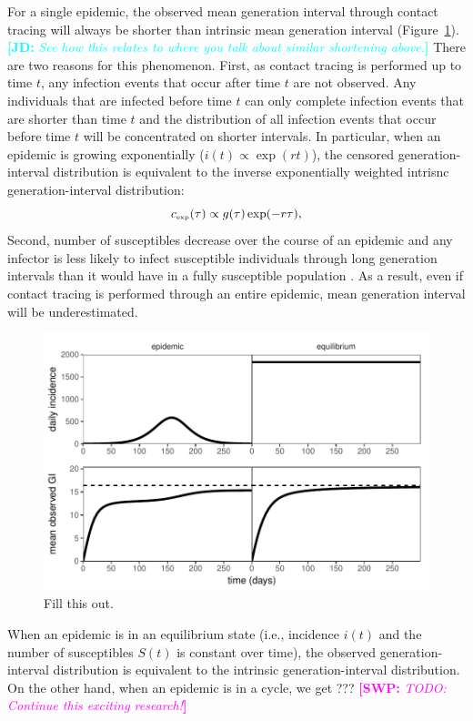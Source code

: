 \documentclass{article}
\newcommand{\tsub}[2]{#1_{{\textrm{\tiny #2}}}}
\newcommand{\comment}[3]{\textcolor{#1}{\textbf{[#2: }\textsl{#3}\textbf{]}}}
\newcommand{\jd}[1]{\comment{cyan}{JD}{#1}}
\newcommand{\swp}[1]{\comment{magenta}{SWP}{#1}}
\begin{document}
For a single epidemic, the observed mean generation interval through contact tracing will always be shorter than intrinsic mean generation interval (Figure~\ref{fig:censor}).
\jd{See how this relates to where you talk about similar shortening above.}
There are two reasons for this phenomenon.
First, as contact tracing is performed up to time $t$, any infection events that occur after time $t$ are not observed.
Any individuals that are infected before time $t$ can only complete infection events that are shorter than time $t$ and the distribution of all infection events that occur before time $t$ will be concentrated on shorter intervals.
In particular, when an epidemic is growing exponentially ($i(t) \propto \exp(rt)$), the censored generation-interval distribution is equivalent to the inverse exponentially weighted intrisnc generation-interval distribution:
\begin{equation}
\tsub{c}{exp}(\tau) \propto g(\tau) \exp(-r\tau),
\end{equation}
Second, number of susceptibles decrease over the course of an epidemic and any infector is less likely to infect susceptible individuals through long generation intervals than it would have in a fully susceptible population \citep{champredon2015intrinsic}.
As a result, even if contact tracing is performed through an entire epidemic, mean generation interval will be underestimated.

\begin{figure}
\includegraphics[width=\textwidth]{../analysis/temporal_effect.pdf}
\caption{Fill this out.}
\label{fig:censor}
\end{figure}

When an epidemic is in an equilibrium state (i.e., incidence $i(t)$ and the number of susceptibles $S(t)$ is constant over time), the observed generation-interval distribution is equivalent to the intrinsic generation-interval distribution.
On the other hand, when an epidemic is in a cycle, we get ???  \swp{TODO: Continue this exciting research!}
\end{document}
